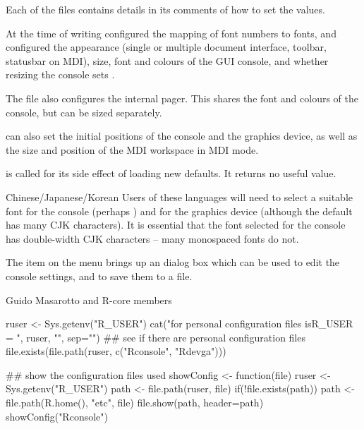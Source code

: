 %
\begin{Value}
Each of the files contains details in its comments of how to set the
values.

At the time of writing  configured the mapping of font
numbers to fonts, and  configured the appearance
(single or multiple document interface, toolbar, statusbar on MDI),
size, font and colours of the GUI console, and whether resizing the
console sets .

The file  also configures the internal pager.  This
shares the font and colours of the console, but can be sized
separately.

 can also set the initial positions of the console and
the graphics device, as well as the size and position of the MDI
workspace in MDI mode.

 is called for its side effect of loading new 
defaults.  It returns no useful value.
\end{Value}
%
\begin{Section}{Chinese/Japanese/Korean}
Users of these languages will need to select a suitable font for the
console (perhaps ) and for the graphics device
(although the default  has many CJK characters).  It is
essential that the font selected for the console has double-width CJK
characters -- many monospaced fonts do not.
\end{Section}
%
\begin{Note}\relax
The  item on the  menu brings up an
dialog box which can be used to edit the console settings, and to save them
to a file.
\end{Note}
%
\begin{Author}\relax
Guido Masarotto and R-core members
\end{Author}
%
\begin{SeeAlso}\relax
{}
\end{SeeAlso}
%
\begin{Examples}
\begin{ExampleCode}
ruser <- Sys.getenv("R_USER")
cat("\n\nLocation for personal configuration files is\n   R_USER = ",
    ruser, "\n\n", sep="")
## see if there are personal configuration files
file.exists(file.path(ruser, c("Rconsole", "Rdevga")))

## show the configuration files used
showConfig <- function(file)
{
    ruser <- Sys.getenv("R_USER")
    path <- file.path(ruser, file)
    if(!file.exists(path)) path <- file.path(R.home(), "etc", file)
    file.show(path, header=path)
}
showConfig("Rconsole")
\end{ExampleCode}
\end{Examples}
